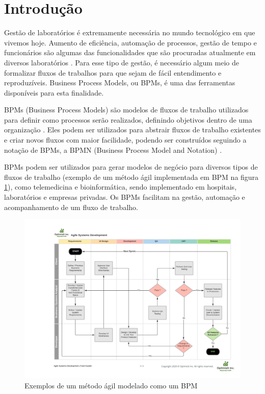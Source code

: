 \section{Introdução} \label{introduction}


Gestão de laboratórios é extremamente necessária no mundo tecnológico em que vivemos hoje. Aumento de eficiência, automação de processos, gestão de tempo e funcionários são algumas das funcionalidades que são procuradas atualmente em diversos laboratórios \cite{sun2021laboratory}. Para esse tipo de gestão, é necessário algum meio de formalizar fluxos de trabalhos para que sejam de fácil entendimento e reproduzíveis. Business Process Models, ou BPMs, é uma das ferramentas disponíveis para esta finalidade.

BPMs (Business Process Models) são modelos de fluxos de trabalho utilizados para definir como processos serão realizados, definindo objetivos dentro de uma organização \cite{Alves2014}. Eles podem ser utilizados para abstrair fluxos de trabalho existentes e criar novos fluxos com maior facilidade, podendo ser construídos seguindo a notação de BPMs, a BPMN (Business Process Model and Notation) \cite{Dijkman2008}.

BPMs podem ser utilizados para gerar modelos de negócio para diversos tipos de fluxos de trabalho (exemplo de um método ágil implementada em BPM na figura \ref{fig:bpm}), como telemedicina e bioinformática, sendo implementado em hospitais, laboratórios e empresas privadas. Os BPMs facilitam na gestão, automação e acompanhamento de um fluxo de trabalho.

\begin{figure}
    \centering
    \includegraphics[width=1\textwidth]{imgs/BPM/sprint as bpm.png}
    \caption{Exemplos de um método ágil modelado como um BPM}
    \label{fig:bpm}
\end{figure}

